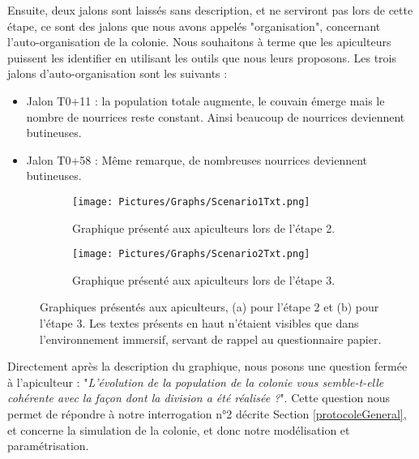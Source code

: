 		Ensuite, deux jalons sont laissés sans description, et ne serviront pas lors de cette étape, ce sont des jalons que nous avons appelés "organisation", concernant l'auto-organisation de la colonie. Nous souhaitons à terme que les apiculteurs puissent les identifier en utilisant les outils que nous leurs proposons. Les trois jalons d'auto-organisation sont les suivants :
		\begin{itemize}
			\item Jalon T0+11 : la population totale augmente, le couvain émerge mais le nombre de nourrices reste constant. Ainsi beaucoup de nourrices deviennent butineuses.
			\item Jalon T0+58 : Même remarque, de nombreuses nourrices deviennent butineuses.
		\end{itemize}
		
		
		\begin{figure}
			\centering
		
			\begin{subfigure}{\textwidth}
			\centering
			\texttt{[image: Pictures/Graphs/Scenario1Txt.png]}
			\caption{Graphique présenté aux apiculteurs lors de l'étape 2.}
			\label{sc1txt}	
			\end{subfigure}
			
			\begin{subfigure}{\textwidth}
			\centering
			\texttt{[image: Pictures/Graphs/Scenario2Txt.png]}
			\caption{Graphique présenté aux apiculteurs lors de l'étape 3.}
			\label{sc2txt}
			\end{subfigure}
			
		\caption[Graphiques présentés aux apiculteurs, (a) pour l'étape  2 et (b) pour l'étape 3]{Graphiques présentés aux apiculteurs, (a) pour l'étape  2 et (b) pour l'étape 3. Les textes présents en haut n'étaient visibles que dans l'environnement immersif, servant de rappel au questionnaire papier.}
		\label{scsTxt}
		\end{figure}
		
		Directement après la description du graphique, nous posons une question fermée à l'apiculteur : "\textit{L'évolution de la population de la colonie vous semble-t-elle cohérente avec la façon dont la division a été réalisée ?}". Cette question nous permet de répondre à notre interrogation n°2 décrite Section \ref{protocoleGeneral}, et concerne la simulation de la colonie, et donc notre modélisation et paramétrisation.
		
